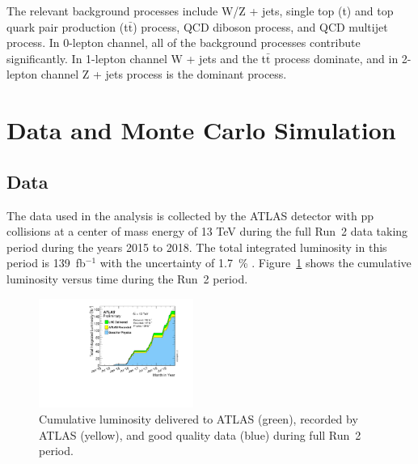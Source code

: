 The relevant background processes include W/Z + jets, single top (t) and top quark pair production (t$\bar{\mathrm{t}}$) process, QCD diboson process, and QCD multijet process.
In 0-lepton channel, all of the background processes contribute significantly. In 1-lepton channel W + jets and the t$\bar{\mathrm{t}}$ process dominate, and in 2-lepton channel Z + jets process is the dominant process.

\section{Data and Monte Carlo Simulation}
\subsection{Data}
The data used in the analysis is collected by the ATLAS detector with pp collisions at a center of mass energy of 13 TeV during the full Run~2 data taking period during the years 2015 to 2018. The total integrated luminosity in this period is 139~fb$^{-1}$ with the uncertainty of 1.7~\% \cite{DAPR-2010-01}. Figure~\ref{fig:luminosity} shows the cumulative luminosity versus time during the Run~2 period.
\begin{figure}[H]
\begin{center}
 \includegraphics[width=0.45\textwidth,keepaspectratio]{figures/intlumivstimeRun2DQall.pdf}
\caption[f]{
Cumulative luminosity delivered to ATLAS (green), recorded by ATLAS (yellow), and good quality data (blue) during full Run~2 period.
}
\label{fig:luminosity}
\end{center}
\end{figure}

